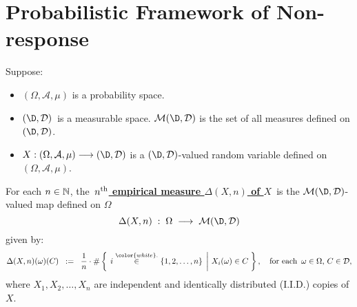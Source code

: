 

\section{Probabilistic Framework of Non-response}
\setcounter{theorem}{0}
\setcounter{equation}{0}


\renewcommand{\theenumi}{\roman{enumi}}
\renewcommand{\labelenumi}{\textnormal{(\theenumi)}$\;\;$}


\begin{definition}
\mbox{}\vskip 0.1cm
\noindent
Suppose:
\begin{itemize}
\item
	$(\Omega,\mathcal{A},\mu)$ is a probability space.
\item
	$(\D,\mathcal{D})$\, is a measurable space.
	$\mathcal{M}(\D,\mathcal{D})$ is the set of all measures defined on $(\D,\mathcal{D})$.
\item
	$X : (\Omega,\mathcal{A},\mu) \longrightarrow (\D,\mathcal{D})$
	is a $(\D,\mathcal{D})$-valued random variable defined on
	$(\Omega,\mathcal{A},\mu)$.
\end{itemize}
For each $n\in\mathbb{N}$, the
\,\underline{\textbf{$n^{\textnormal{th}}$ empirical measure $\Delta(X,n)$ of $X$}}\,
is the $\mathcal{M}(\D,\mathcal{D})$-valued map defined on $\Omega$
\begin{equation*}
\Delta(X,n) \; : \; \Omega \;\longrightarrow\; \mathcal{M}(\D,\mathcal{D})
\end{equation*}
given by:
\begin{equation*}
\Delta(X,n)(\omega)(C)
\;\; := \;\;
	\dfrac{1}{n} \cdot
	\#\left\{\;
	\left.
		i \overset{{\color{white}.}}{\in} \{1,2,\ldots,n\}
	\;\,\right\vert\,
		X_{i}(\omega) \in C
	\;\right\},
	\quad
	\textnormal{for each \,$\omega\in\Omega$, $C \in \mathcal{D}$},
\end{equation*}
where $X_{1}, X_{2}, \ldots, X_{n}$ are independent and identically distributed (I.I.D.) copies of $X$.
\end{definition}


